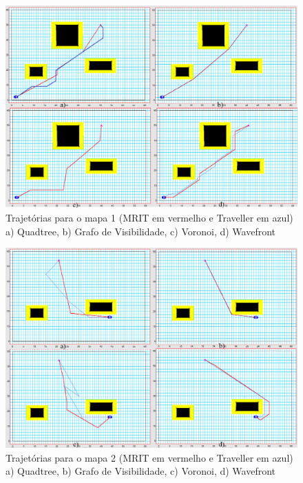 \begin{figure}[h]
	\centering
	\label{fig39}
		\includegraphics[keepaspectratio=true,scale=0.25]{figuras/mapa1.jpg}
	\caption{Trajetórias para o mapa 1 (MRIT em vermelho e Traveller em azul) a) Quadtree, b) Grafo de Visibilidade, c) Voronoi, d) Wavefront}
\end{figure}

\begin{figure}[h]
	\centering
	\label{fig40}
		\includegraphics[keepaspectratio=true,scale=0.25]{figuras/mapa2.jpg}
	\caption{Trajetórias para o mapa 2 (MRIT em vermelho e Traveller em azul) a) Quadtree, b) Grafo de Visibilidade, c) Voronoi, d) Wavefront}
\end{figure}

